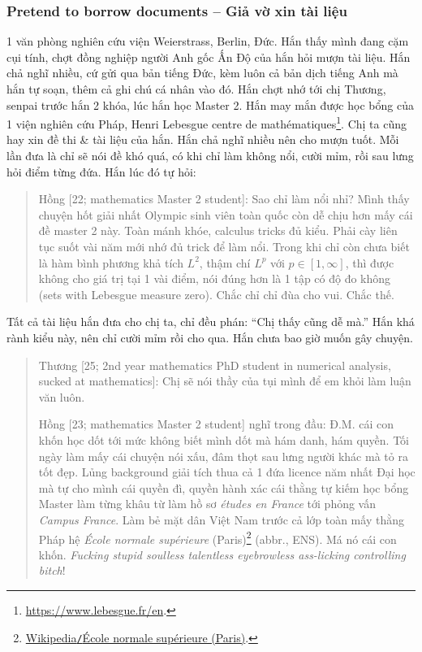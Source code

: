 \documentclass[12pt]{article}
\begin{document}
\subsubsection{Pretend to borrow documents -- Giả vờ xin tài liệu}
1 văn phòng nghiên cứu viện Weierstrass, Berlin, Đức. Hắn thấy mình đang cặm cụi tính, chợt đồng nghiệp người Anh gốc Ấn Độ của hắn hỏi mượn tài liệu. Hắn chả nghĩ nhiều, cứ gửi qua bản tiếng Đức, kèm luôn cả bản dịch tiếng Anh mà hắn tự soạn, thêm cả ghi chú cá nhân vào đó. Hắn chợt nhớ tới chị Thương, senpai trước hắn 2 khóa, lúc hắn học Master 2. Hắn may mắn được học bổng của 1 viện nghiên cứu Pháp, Henri Lebesgue centre de math\'ematiques\footnote{\url{https://www.lebesgue.fr/en}.}. Chị ta cũng hay xin đề thi \& tài liệu của hắn. Hắn chả nghĩ nhiều nên cho mượn tuốt. Mỗi lần đưa là chỉ sẽ nói đề khó quá, có khi chỉ làm không nổi, cười mỉm, rồi sau lưng hỏi điểm từng đứa. Hắn lúc đó tự hỏi:
\begin{quotation}
	{\sf Hồng [22; mathematics Master 2 student]}: Sao chỉ làm nổi nhỉ? Mình thấy chuyện hốt giải nhất Olympic sinh viên toàn quốc còn dễ chịu hơn mấy cái đề master 2 này. Toàn mánh khóe, calculus tricks đủ kiểu. Phải cày liên tục suốt vài năm mới nhớ đủ trick để làm nổi. Trong khi chỉ còn chưa biết là hàm bình phương khả tích $L^2$, thậm chí $L^p$ với $p\in[1,\infty]$, thì được không cho giá trị tại 1 vài điểm, nói đúng hơn là 1 tập có độ đo không (sets with Lebesgue measure zero). Chắc chỉ chỉ đùa cho vui. Chắc thế.
\end{quotation}
Tất cả tài liệu hắn đưa cho chị ta, chỉ đều phán: ``Chị thấy cũng dễ mà.'' Hắn khá rành kiểu này, nên chỉ cười mỉm rồi cho qua. Hắn chưa bao giờ muốn gây chuyện.
\begin{quotation}
	{\sf Thương [25; 2nd year mathematics PhD student in numerical analysis, sucked at mathematics]}: Chị sẽ nói thầy của tụi mình để em khỏi làm luận văn luôn.
	
	{\sf Hồng [23; mathematics Master 2 student]} nghĩ trong đầu: Đ.M. cái con khốn học dốt tới mức không biết mình dốt mà hám danh, hám quyền. Tối ngày làm mấy cái chuyện nói xấu, đâm thọt sau lưng người khác mà tỏ ra tốt đẹp. Lủng background giải tích thua cả 1 đứa licence năm nhất Đại học mà tự cho mình cái quyền đì, quyền hành xác cái thằng tự kiếm học bổng Master làm từng khâu từ làm hồ sơ {\it \'etudes en France} tới phỏng vấn {\it Campus France}. Làm bẻ mặt dân Việt Nam trước cả lớp toàn mấy thằng Pháp hệ {\it École normale supérieure} (Paris)\footnote{\href{https://en.wikipedia.org/wiki/Ecole_normale_superieure_(Paris)}{Wikipedia{\tt/}École normale supérieure (Paris)}.} (abbr., ENS). Má nó cái con khốn. {\it Fucking stupid soulless talentless eyebrowless ass-licking controlling bitch}!
\end{quotation}
\end{document}
